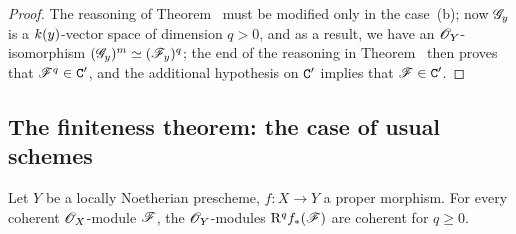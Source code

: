 \begin{proof}
The reasoning of Theorem~ must be modified only in the case~(b); now $\mathscr{G}_y$ is a $k(y)$-vector space of dimension $q>0$, and as a result, we have an $\mathscr{O}_Y$-isomorphism $(\mathscr{G}_y)^m\simeq(\mathscr{F}_y)^q$; the end of the reasoning in Theorem~ then proves that $\mathscr{F}^q\in\mathtt{C}'$, and the additional hypothesis on $\mathtt{C}'$ implies that $\mathscr{F}\in\mathtt{C}'$.
\end{proof}

\subsection{The finiteness theorem: the case of usual schemes}
\label{subsection:III.3.2}

\begin{theorem}[3.2.1]
\label{III.3.2.1}
Let $Y$ be a locally Noetherian prescheme, $f:X\to Y$ a proper morphism.
For every coherent $\mathscr{O}_X$-module $\mathscr{F}$, the $\mathscr{O}_Y$-modules $\mathrm{R}^q f_*(\mathscr{F})$ are coherent for $q\geq 0$.
\end{theorem}

